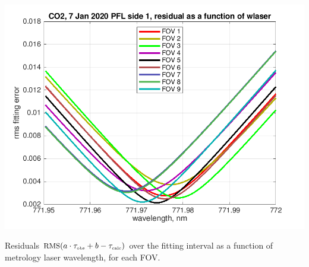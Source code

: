\documentclass[10pt]{beamer}
\begin{document}
\begin{frame}
\begin{columns}[t]
\begin{column}{0.5\textwidth}
  \begin{centering}
  \includegraphics[width=\textwidth]{figures/CO2_wlaser_fit.png}
  \end{centering}\vspace{3mm}

Residuals $\mbox{\small RMS}(a\cdot\tau_{\mbox{\tiny obs}} + b - \tau_{\mbox{\tiny calc}})$ over the fitting
interval as a function of metrology laser wavelength, for each FOV.

\end{column}
\end{columns}
\end{frame}
\end{document}
